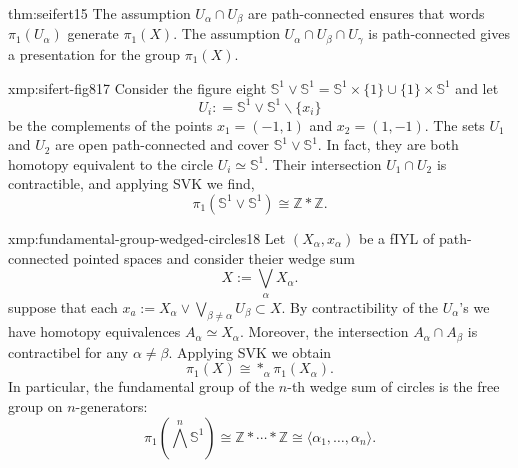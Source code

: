 \documentclass[landscape, 8pt]{extarticle}
\begin{document}
\begin{multicols*}{3}
\begin{thm}{thm:seifert}{15}
	The assumption $U_{\alpha} \cap U_{\beta}$ are path-connected ensures that words $\pi_{1}(U_{\alpha})$ generate $\pi_{1}(X)$. The assumption $U_{\alpha} \cap U_{\beta} \cap U_{\gamma}$ is path-connected gives a presentation for the group $\pi_{1}(X)$.
\end{thm}

\begin{xmp}{xmp:sifert-fig8}{17}
	Consider the figure eight $\mathbb{S}^{1} \vee \mathbb{S}^{1} = \mathbb{S}^{1} \times \{1\} \cup \{1\} \times \mathbb{S}^{1}$ and let
	\[U_{i} : = \mathbb{S}^{1} \vee \mathbb{S}^{1} \backslash \{x_{i}\}\]
	be the complements of the points $x_{1} = (-1,1)$ and $x_{2} = (1, -1)$. The sets $U_{1}$ and $U_{2}$ are open path-connected and cover $\mathbb{S}^{1} \vee \mathbb{S}^{1}$. In fact, they are both homotopy equivalent to the circle $U_{i} \simeq \mathbb{S}^{1}$. Their intersection $U_{1} \cap U_{2}$ is contractible, and applying SVK we find,
	\[\pi_{1}(\mathbb{S}^{1} \vee \mathbb{S}^{1}) \cong \mathbb{Z} \ast \mathbb{Z}.\]
\end{xmp}

\begin{xmp}{xmp:fundamental-group-wedged-circles}{18}
	Let $(X_{\alpha}, x_{\alpha})$ be a fIYL of path-connected pointed spaces and consider theier wedge sum
	\[X := \bigvee_{\alpha} X_{\alpha}.\]
	suppose that each $x_{a}:= X_{\alpha} \vee \bigvee_{\beta \ne \alpha} U_{\beta} \subset X$.
	By contractibility of the $U_{\alpha}$'s we have homotopy equivalences $A_{\alpha} \simeq X_{\alpha}$. Moreover, the intersection $A_{\alpha} \cap A_{\beta}$ is contractibel for any $\alpha\ne \beta$. Applying SVK we obtain
	\[\pi_{1}(X) \cong \ast_{\alpha} \pi_{1}(X_{\alpha}).\]
	In particular, the fundamental group of the $n$-th wedge sum of circles is the free group on $n$-generators:
	\setcounter{equation}{22}
	\begin{equation}
		\pi_{1}\left(\bigwedge^{n} \mathbb{S}^{1}\right) \cong \mathbb{Z} \ast \cdots \ast \mathbb{Z} \cong \langle  \alpha_{1},\dots, \alpha_{n} \rangle.
	\end{equation}
\end{xmp}

\columnbreak


\end{multicols*}
\end{document}

